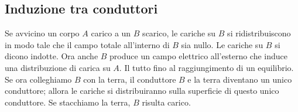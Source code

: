 \subsection{Induzione tra conduttori}
Se avvicino un corpo $A$ carico a un $B$ scarico, le cariche su $B$ si ridistribuiscono in modo tale che il campo totale all'interno di $B$ sia nullo. Le cariche su $B$ si dicono indotte. Ora anche $B$ produce un campo elettrico all'esterno che induce una distribuzione di carica su $A$. Il tutto fino al raggiungimento di un equilibrio. Se ora colleghiamo $B$ con la terra, il conduttore $B$ e la terra diventano un unico conduttore; allora le cariche si distribuiranno sulla superficie di questo unico conduttore. Se stacchiamo la terra, $B$ risulta carico.
\begin{figure}[htbp]
\centering
{}
\qquad
{}

\end{figure}
